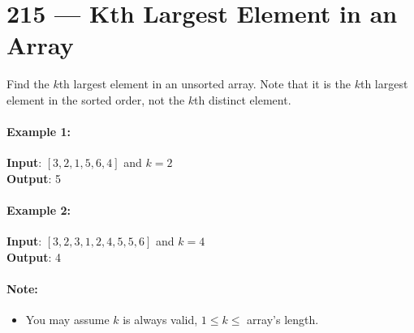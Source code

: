 \section{215 --- Kth Largest Element in an Array}
Find the $k$th largest element in an unsorted array. Note that it is the $k$th largest element in the sorted order, not the $k$th distinct element.
\paragraph{Example 1:}
\begin{flushleft}
\textbf{Input}: $[3,2,1,5,6,4]$ and $k = 2$
\\
\textbf{Output}: 5
\end{flushleft}
\paragraph{Example 2:}
\begin{flushleft}
\textbf{Input}: $[3,2,3,1,2,4,5,5,6]$ and $k = 4$
\\
\textbf{Output}: 4
\end{flushleft}
\paragraph{Note:} 
\begin{itemize}
\item You may assume $k$ is always valid, $1 \leq k \leq $ array's length.
\end{itemize}
